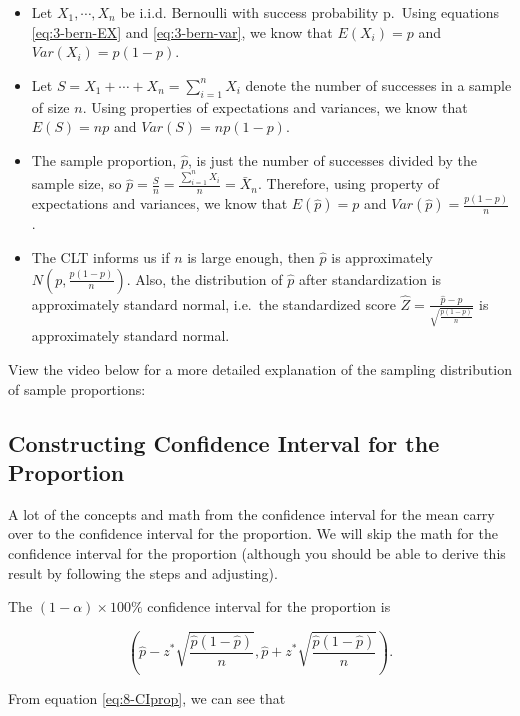 \documentclass[
]{book}
\begin{document}
\begin{itemize}
\item
  Let \(X_1, \cdots, X_n\) be i.i.d. Bernoulli with success probability p.~Using equations \eqref{eq:3-bern-EX} and \eqref{eq:3-bern-var}, we know that \(E(X_i) = p\) and \(Var(X_i) = p(1-p)\).
\item
  Let \(S = X_1 + \cdots + X_n = \sum_{i=1}^n X_i\) denote the number of successes in a sample of size \(n\). Using properties of expectations and variances, we know that \(E(S) = np\) and \(Var(S) = np(1-p)\).
\item
  The sample proportion, \(\hat{p}\), is just the number of successes divided by the sample size, so \(\hat{p} = \frac{S}{n} = \frac{\sum_{i=1}^n X_i}{n} = \bar{X}_n\). Therefore, using property of expectations and variances, we know that \(E(\hat{p}) = p\) and \(Var(\hat{p}) = \frac{p(1-p)}{n}\).
\item
  The CLT informs us if \(n\) is large enough, then \(\hat{p}\) is approximately \(N\left(p, \frac{p(1-p)}{n}\right)\). Also, the distribution of \(\hat{p}\) after standardization is approximately standard normal, i.e.~the standardized score \(\hat{Z} = \frac{\hat{p}-p}{\sqrt{\frac{p(1-p)}{n}}}\) is approximately standard normal.
\end{itemize}

View the video below for a more detailed explanation of the sampling distribution of sample proportions:

\subsection{Constructing Confidence Interval for the Proportion}\label{constructing-confidence-interval-for-the-proportion}

A lot of the concepts and math from the confidence interval for the mean carry over to the confidence interval for the proportion. We will skip the math for the confidence interval for the proportion (although you should be able to derive this result by following the steps and adjusting).

The \((1-\alpha) \times 100\%\) confidence interval for the proportion is

\begin{equation} 
\left( \hat{p} - z^{*} \sqrt{\frac{\hat{p}(1-\hat{p})}{n}}, \hat{p} + z^{*} \sqrt{\frac{\hat{p}(1-\hat{p})}{n}} \right).
\label{eq:8-CIprop}
\end{equation}

From equation \eqref{eq:8-CIprop}, we can see that
\end{document}
